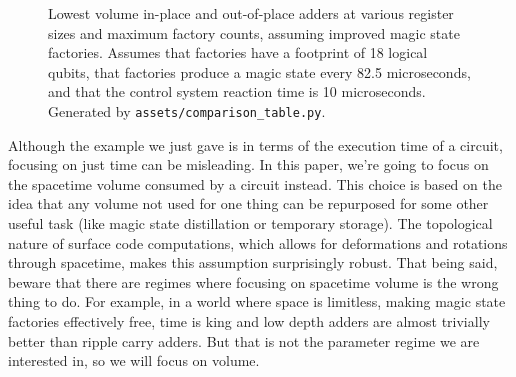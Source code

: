 \documentclass[onecolumn,unpublished]{quantumarticle}
\theoremstyle{definition}
\theoremstyle{definition}
\theoremstyle{definition}
\begin{document}
\begin{figure}
    \centering
    \caption{
        Lowest volume in-place and out-of-place adders at various register sizes and maximum factory counts, assuming improved magic state factories.
        Assumes that factories have a footprint of 18 logical qubits, that factories produce a magic state every 82.5 microseconds, and that the control system reaction time is 10 microseconds.
        Generated by \texttt{assets/comparison\_table.py}.
    }
    \label{fig:minioh}
\end{figure}

Although the example we just gave is in terms of the execution time of a circuit, focusing on just time can be misleading.
In this paper, we're going to focus on the spacetime volume consumed by a circuit instead.
This choice is based on the idea that any volume not used for one thing can be repurposed for some other useful task (like magic state distillation or temporary storage).
The topological nature of surface code computations, which allows for deformations and rotations through spacetime, makes this assumption surprisingly robust.
That being said, beware that there are regimes where focusing on spacetime volume is the wrong thing to do.
For example, in a world where space is limitless, making magic state factories effectively free, time is king and low depth adders are almost trivially better than ripple carry adders.
But that is not the parameter regime we are interested in, so we will focus on volume.
\end{document}
